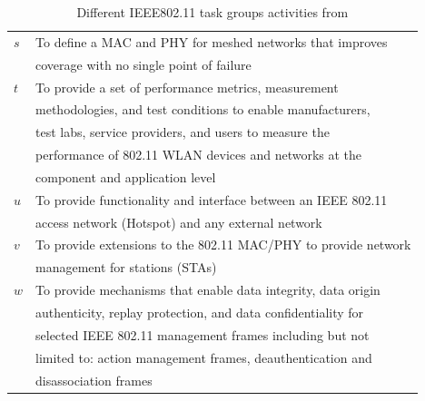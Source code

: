 \documentclass[journal,transmag]{IEEEtran}
\begin{document}
\begin{center}
\begin{table}[htbp]
\begin{tabular}{|p{}|p{}|}
$s$				& To define a MAC and PHY for meshed networks that improves \\
				& coverage with no single point of failure \\			
$t$				& To provide a set of performance metrics, measurement \\
				& methodologies, and test conditions to enable manufacturers, \\
				& test labs, service providers, and users to measure the \\ 
				& performance of 802.11 WLAN devices and networks at the \\
				& component and application level\\
$u$				& To provide functionality and interface between an IEEE 802.11 \\
				& access network (Hotspot) and any external network\\
$v$				& To provide extensions to the 802.11 MAC/PHY to provide network \\
				& management for stations (STAs) \\
$w$				& To provide mechanisms that enable data integrity, data origin \\
				& authenticity, replay protection, and data confidentiality for \\
				& selected IEEE 802.11 management frames including but not \\
				& limited to: action management frames, deauthentication and \\
				& disassociation frames\\

\hline
\end{tabular}
\caption{\label{IEEE802.11 task groups} Different IEEE802.11 task groups activities from \cite{17CISCO_mobility_guide} }
\end{table}
\end{center}
\end{document}
